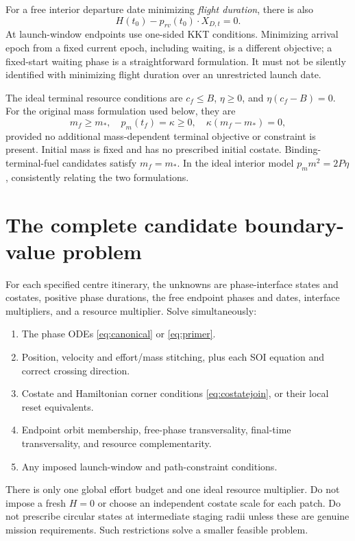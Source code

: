 \documentclass[journal, a4paper]{IEEEtran}
\begin{document}
For a free interior departure date minimizing \emph{flight duration}, there is also
\begin{equation}
 H(t_0)-p_{rv}(t_0)\cdot X_{D,t}=0.
 \label{eq:t0}
\end{equation}
At launch-window endpoints use one-sided KKT conditions. Minimizing arrival epoch from a fixed current epoch, including waiting, is a different objective; a fixed-start waiting phase is a straightforward formulation. It must not be silently identified with minimizing flight duration over an unrestricted launch date.

The ideal terminal resource conditions are $c_f\le B$, $\eta\ge0$, and $\eta(c_f-B)=0$. For the original mass formulation used below, they are
\begin{equation}
 m_f\ge m_*,\quad p_m(t_f)=\kappa\ge0,\quad
 \kappa(m_f-m_*)=0,
 \label{eq:massend}
\end{equation}
provided no additional mass-dependent terminal objective or constraint is present. Initial mass is fixed and has no prescribed initial costate. Binding-terminal-fuel candidates satisfy $m_f=m_*$. In the ideal interior model $p_m m^2=2P\eta$, consistently relating the two formulations.

\section{The complete candidate boundary-value problem}
For each specified centre itinerary, the unknowns are phase-interface states and costates, positive phase durations, the free endpoint phases and dates, interface multipliers, and a resource multiplier. Solve simultaneously:
\begin{enumerate}
\item The phase ODEs \eqref{eq:canonical} or \eqref{eq:primer}.
\item Position, velocity and effort/mass stitching, plus each SOI equation and correct crossing direction.
\item Costate and Hamiltonian corner conditions \eqref{eq:costatejoin}, or their local reset equivalents.
\item Endpoint orbit membership, free-phase transversality, final-time transversality, and resource complementarity.
\item Any imposed launch-window and path-constraint conditions.
\end{enumerate}
There is only one global effort budget and one ideal resource multiplier. Do not impose a fresh $H=0$ or choose an independent costate scale for each patch. Do not prescribe circular states at intermediate staging radii unless these are genuine mission requirements. Such restrictions solve a smaller feasible problem.
\end{document}
